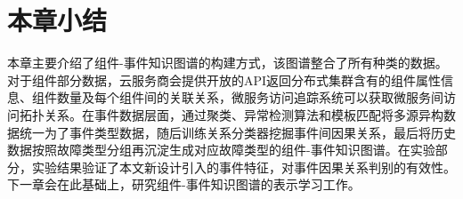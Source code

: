 \section{本章小结}
本章主要介绍了组件-事件知识图谱的构建方式，该图谱整合了所有种类的数据。对于组件部分数据，云服务商会提供开放的API返回分布式集群含有的组件属性信息、组件数量及每个组件间的关联关系，微服务访问追踪系统可以获取微服务间访问拓扑关系。在事件数据层面，通过聚类、异常检测算法和模板匹配将多源异构数据统一为了事件类型数据，随后训练关系分类器挖掘事件间因果关系，最后将历史数据按照故障类型分组再沉淀生成对应故障类型的组件-事件知识图谱。在实验部分，实验结果验证了本文新设计引入的事件特征，对事件因果关系判别的有效性。下一章会在此基础上，研究组件-事件知识图谱的表示学习工作。


